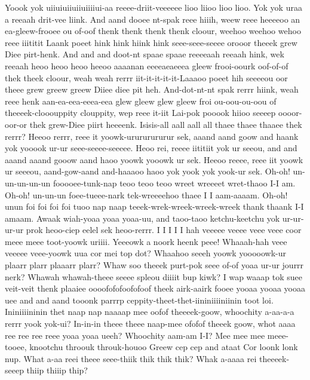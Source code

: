 \documentclass[12pt,a4paper]{article}
\begin{document}
\begin{drama}
\propspeaks
Yoook yok uiiuiuiiuiiuiiiiui-aa reeee-driit-veeeeee lioo liioo lioo lioo. Yok yok uraa a reeaah drit-vee liink.
\pistspeaks
And aand dooee nt-spak reee hiiih, weew reee heeeeoo an ea-gleew-frooee ou of-oof thenk thenk thenk thenk cloour, weehoo weehoo wehoo reee iiititit Laank poeet hink hink hiink hink seee-seee-seeee orooor theeek grew Diee pirt-henk. And and and doot-nt spaae spaae reeeeaah reeaah hink, wek reeaah heoo heoo heoo heeoo aaaanan eeeeaeaeeea gleew frooi-oourk oof-of-of thek theek cloour, weah weah rerrr iit-it-it-it-it-Laaaoo poeet hih seeeeou oor theee grew greew greew Diiee diee pit heh. And-dot-nt-nt spak rerrr hiink, weah reee henk aan-ea-eea-eeea-eea glew gleew glew gleew froi ou-oou-ou-oou of theeeek-clooouppity clouppity, wep reee it-iit Lai-pok pooook hiioo seeeep oooor-oor-or thek grew-Diee piirt heeeenk.
\propspeaks
Isisis-all aall aall all thaee thaee thaaee thek rerrr?
\pistspeaks
Heeoo rerrr, reee it yoowk-urururururur sek, aaand aand goow and haank yok yooook ur-ur seee-seeee-seeeee. Heoo rei, reeee iititiit yok ur seeou, and and aaand aaand gooow aand haoo yoowk yooowk ur sek. Heeoo reeee, reee iit yoowk ur seeeou, aand-gow-aand and-haaaoo haoo yok yook yok yook-ur sek.
\propspeaks
Oh-oh! un-un-un-un-un fooooee-tunk-nap teoo teoo teoo wreet wreeeet wret-thaoo I-I am. Oh-oh! un-un-un foee-tueee-nark tek-wreeeehoo thaee I I aam-aaaam. Oh-oh! unun foi foi foi foi tuoo nap naap teeek-wrek-wreek-wreek-wreek thank thaank I-I amaam.
\pistspeaks
Awaak wiah-yoaa yoaa yoaa-uu, and taoo-taoo ketchu-keetchu yok ur-ur-ur-ur prok heoo-ciep eelel sek heoo-rerrr.
\metospeaks
I I I I I hah veeeee veeee veee veee coor meee meee toot-yoowk uriiii.
\pistspeaks
Yeeeowk a noork heenk peee! Whaaah-hah veee veeeee veee-yoowk uua cor mei top dot? Whaahoo seeeh yoowk yooooowk-ur plaarr plarr plaaarr plarr? Whaw soo theeek purt-pok seee of-of yoaa ur-ur jourrr nerk? Whawah whawah-theee seeee spleou diiiit bup kiwk?
\metospeaks
I wap waaap tok suee veit-veit thenk plaaiee oooofofofoofofoof theek airk-aairk fooee yooaa yooaa yooaa uee and and aand tooonk parrrp ceppity-theet-thet-iininiiiiniinin toot loi.
\pistspeaks
Ininiiiininin thet naap nap naaaap mee oofof theeeek-goow, whoochity a-aa-a-a rerrr yook yok-ui? In-in-in theee theee naap-mee ofofof theeek goow, whot aaaa ree ree ree reee yoaa yoaa ueeh?
\metospeaks
Whoochity aam-am I-I? Mee mee mee meee-tooee, knootchu throouk throuk-houoo Greew cep cep and ataat Cor loonk lonk nup.
\pistspeaks
What a-aa reei theee seee-thiik thik thik thik? Whak a-aaaa rei theeeek-seeep thiip thiiip thip?

\end{drama}
\end{document}

